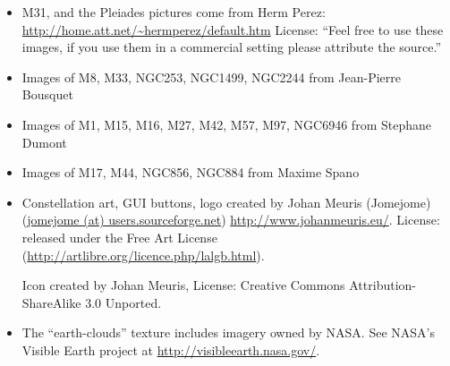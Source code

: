 \begin{itemize}
\item M31, and the Pleiades pictures come from Herm Perez: \url{http://home.att.net/~hermperez/default.htm}
	  License: ``Feel free to use these images, if you use them in a commercial setting please attribute the source.''
\item Images of M8, M33, NGC253, NGC1499, NGC2244 from Jean-Pierre Bousquet
\item Images of M1, M15, M16, M27, M42, M57, M97, NGC6946 from Stephane Dumont
\item Images of M17, M44, NGC856, NGC884 from Maxime Spano
\item Constellation art, GUI buttons, logo created by Johan Meuris (Jomejome) (\url{jomejome (at) users.sourceforge.net})
	  \url{http://www.johanmeuris.eu/}.
	  License: released under the Free Art License (\url{http://artlibre.org/licence.php/lalgb.html}).
		 
	  Icon created by Johan Meuris, License: Creative Commons Attribution-ShareAlike 3.0 Unported.
\item The ``earth-clouds'' texture includes imagery owned by NASA.
	  See NASA's Visible Earth project at \url{http://visibleearth.nasa.gov/}.


\end{itemize}
